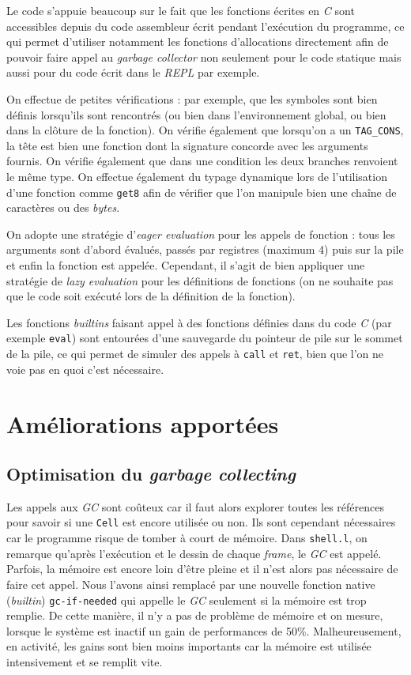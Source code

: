 \documentclass[a4paper, 10pt, french]{article}
\newcommand{\codeC}[1]{\texttt{#1}}
\newcommand{\codeLisp}[1]{\texttt{#1}}
\newcommand{\codeASM}[1]{\texttt{#1}}
\newcommand{\code}[1]{\texttt{#1}}
\newcommand{\foreign}[1]{\emph{#1}}
\begin{document}
Le code s'appuie beaucoup sur le fait que les fonctions écrites en \foreign{C} sont accessibles depuis du code assembleur écrit pendant l'exécution du programme, ce qui permet d'utiliser notamment les fonctions d'allocations directement afin de pouvoir faire appel au \foreign{garbage collector} non seulement pour le code statique mais aussi pour du code écrit dans le \foreign{REPL} par exemple.

On effectue de petites vérifications : par exemple, que les symboles sont bien définis lorsqu'ils sont rencontrés (ou bien dans l'environnement global, ou bien dans la clôture de la fonction). On vérifie également que lorsqu'on a un \codeC{TAG_CONS}, la tête est bien une fonction dont la signature concorde avec les arguments fournis. On vérifie également que dans une condition les deux branches renvoient le même type. On effectue également du typage dynamique lors de l'utilisation d'une fonction comme \codeLisp{get8} afin de vérifier que l'on manipule bien une chaîne de caractères ou des \foreign{bytes}.

On adopte une stratégie d'\foreign{eager evaluation} pour les appels de fonction : tous les arguments sont d'abord évalués, passés par registres (maximum 4) puis sur la pile et enfin la fonction est appelée. Cependant, il s'agit de bien appliquer une stratégie de \foreign{lazy evaluation} pour les définitions de fonctions (on ne souhaite pas que le code soit exécuté lors de la définition de la fonction).

Les fonctions \foreign{builtins} faisant appel à des fonctions définies dans du code \foreign{C} (par exemple \codeLisp{eval}) sont entourées d'une sauvegarde du pointeur de pile sur le sommet de la pile, ce qui permet de simuler des appels à \codeASM{call} et \codeASM{ret}, bien que l'on ne voie pas en quoi c'est nécessaire.


\section{Améliorations apportées}

\subsection{Optimisation du \foreign{garbage collecting}}

Les appels aux \foreign{GC} sont coûteux car il faut alors explorer toutes les références pour savoir si une \codeC{Cell} est encore utilisée ou non. Ils sont cependant nécessaires car le programme risque de tomber à court de mémoire. Dans \code{shell.l}, on remarque qu'après l'exécution et le dessin de chaque \foreign{frame}, le \foreign{GC} est appelé. Parfois, la mémoire est encore loin d'être pleine et il n'est alors pas nécessaire de faire cet appel. Nous l'avons ainsi remplacé par une nouvelle fonction native (\foreign{builtin}) \codeLisp{gc-if-needed} qui appelle le \foreign{GC} seulement si la mémoire est trop remplie. De cette manière, il n'y a pas de problème de mémoire et on mesure, lorsque le système est inactif un gain de performances de 50\%. Malheureusement, en activité, les gains sont bien moins importants car la mémoire est utilisée intensivement et se remplit vite.
\end{document}
